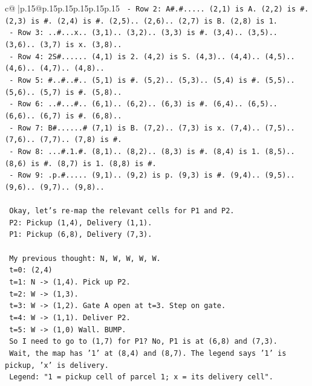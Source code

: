 \documentclass{article}
\begin{document}
{\begin{supertabular}{c@{$\;$}|p{.15\linewidth}@{}p{.15\linewidth}p{.15\linewidth}p{.15\linewidth}p{.15\linewidth}p{.15\linewidth}}
{{{\texttt{   {-} Row 2: A\#.\#..... (2,1) is A. (2,2) is \#. (2,3) is \#. (2,4) is \#. (2,5).. (2,6).. (2,7) is B. (2,8) is 1.} \\
\texttt{   {-} Row 3: ..\#...x.. (3,1).. (3,2).. (3,3) is \#. (3,4).. (3,5).. (3,6).. (3,7) is x. (3,8)..} \\
\texttt{   {-} Row 4: 2S\#...... (4,1) is 2. (4,2) is S. (4,3).. (4,4).. (4,5).. (4,6).. (4,7).. (4,8)..} \\
\texttt{   {-} Row 5: \#..\#..\#.. (5,1) is \#. (5,2).. (5,3).. (5,4) is \#. (5,5).. (5,6).. (5,7) is \#. (5,8)..} \\
\texttt{   {-} Row 6: ..\#...\#.. (6,1).. (6,2).. (6,3) is \#. (6,4).. (6,5).. (6,6).. (6,7) is \#. (6,8)..} \\
\texttt{   {-} Row 7: B\#......\# (7,1) is B. (7,2).. (7,3) is x. (7,4).. (7,5).. (7,6).. (7,7).. (7,8) is \#.} \\
\texttt{   {-} Row 8: ...\#.1.\#. (8,1).. (8,2).. (8,3) is \#. (8,4) is 1. (8,5).. (8,6) is \#. (8,7) is 1. (8,8) is \#.} \\
\texttt{   {-} Row 9: .p.\#..... (9,1).. (9,2) is p. (9,3) is \#. (9,4).. (9,5).. (9,6).. (9,7).. (9,8)..} \\
\\ 
\texttt{   Okay, let's re{-}map the relevant cells for P1 and P2.} \\
\texttt{   P2: Pickup (1,4), Delivery (1,1).} \\
\texttt{   P1: Pickup (6,8), Delivery (7,3).} \\
\\ 
\texttt{   My previous thought: N, W, W, W, W.} \\
\texttt{   t=0: (2,4)} \\
\texttt{   t=1: N {-}> (1,4). Pick up P2.} \\
\texttt{   t=2: W {-}> (1,3).} \\
\texttt{   t=3: W {-}> (1,2). Gate A open at t=3. Step on gate.} \\
\texttt{   t=4: W {-}> (1,1). Deliver P2.} \\
\texttt{   t=5: W {-}> (1,0) Wall. BUMP.} \\
\texttt{   So I need to go to (1,7) for P1? No, P1 is at (6,8) and (7,3).} \\
\texttt{   Wait, the map has '1' at (8,4) and (8,7). The legend says '1' is pickup, 'x' is delivery.} \\
\texttt{   Legend: "1 = pickup cell of parcel 1; x = its delivery cell".} \\
}}}
\end{supertabular}}
\end{document}
